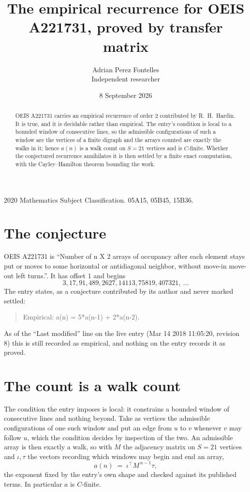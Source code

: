 \documentclass[11pt,a4paper]{article}
\title{The empirical recurrence for OEIS A221731, proved by transfer matrix}
\author{Adrian Perez Fontelles\\ \small Independent researcher}
\date{8 September 2026}
\theoremstyle{plain}
\theoremstyle{definition}
\begin{document}
\maketitle

\begin{abstract}
OEIS A221731 carries an empirical recurrence of order $2$ contributed by R.~H.~Hardin. It is
true, and it is decidable rather than empirical. The entry's condition is local to a bounded window of consecutive lines, so
the admissible configurations of such a window are the vertices of a finite digraph and the
arrays counted are exactly the walks in it; hence $a(n)$ is a walk count on $S=21$ vertices
and is $C$-finite. Whether the conjectured recurrence annihilates it is then settled by a
finite exact computation, with the Cayley--Hamilton theorem bounding the work.
\end{abstract}

\noindent\small 2020 Mathematics Subject Classification. 05A15, 05B45, 15B36.\normalsize

\section{The conjecture}

OEIS A221731 is ``Number of n X 2 arrays of occupancy after each element stays put or moves to some horizontal or antidiagonal neighbor, without move-in move-out left turns.''. It has offset $1$ and begins
\[
3, 17, 91, 489, 2627, 14113, 75819, 407321,\ \dots
\]
The entry states, as a conjecture contributed by its author and never marked settled:
\begin{quote}
Empirical: a(n) = 5*a(n-1) + 2*a(n-2).
\end{quote}
As of the ``Last modified'' line on the live entry (Mar 14 2018 11:05:20, revision 8) this is still
recorded as empirical, and nothing on the entry records it as proved.

\section{The count is a walk count}

The condition the entry imposes is local: it constrains a bounded window of consecutive lines and nothing beyond. Take as
vertices the admissible configurations of one such window and put an edge from $u$ to $v$
whenever $v$ may follow $u$, which the condition decides by inspection of the two. An
admissible array is then exactly a walk, so with $M$ the adjacency matrix on $S=21$ vertices
and $\iota,\tau$ the vectors recording which windows may begin and end an array,
\[
a(n)\;=\;\iota^{\!\top}M^{\,n-1}\tau ,
\]
the exponent fixed by the entry's own shape and checked against its published terms. In
particular $a$ is $C$-finite.
\end{document}
